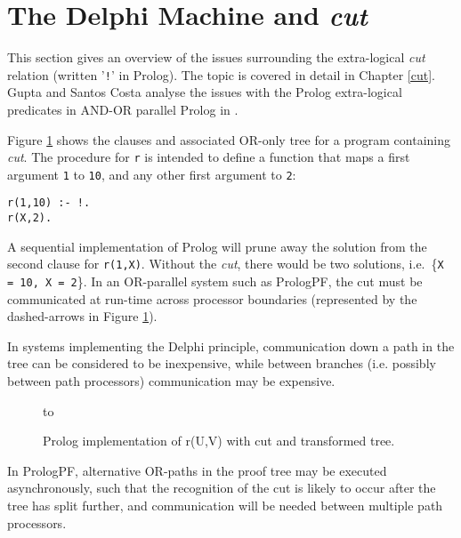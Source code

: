 \section{The Delphi Machine and \textit{cut}} %

This section gives an overview of the issues surrounding the extra-logical \textit{cut}
relation (written '\texttt{!}' in Prolog).  The topic is covered in detail in
Chapter \ref{cut}.  Gupta and Santos Costa analyse the issues with the Prolog extra-logical
predicates in AND-OR parallel Prolog in \cite{GSC92}.

Figure \ref{cut_tree} shows the clauses and associated OR-only tree for a 
program containing \textit{cut}.  The procedure for \texttt{r} is intended to
define a function that maps a first argument
 \texttt{1} to \texttt{10}, and any other first argument
to \texttt{2}:
\begin{verbatim}
r(1,10) :- !.
r(X,2).
\end{verbatim}

A sequential implementation of Prolog will prune away
the solution from the second clause
for \texttt{r(1,X)}.  Without the \textit{cut}, there
would be two solutions, i.e.\ \{\texttt{X = 10, X = 2}\}.
In an OR-parallel system such as PrologPF, the cut must be
communicated at run-time
across processor boundaries (represented by the dashed-arrows in
Figure \ref{cut_tree}).

In systems implementing the Delphi principle, communication down
a path in the tree can be considered to be inexpensive, while between branches
(i.e. possibly between path processors) communication may be expensive.

\begin{figure}[h]
\vspace{5mm} \hbox to 
\caption{Prolog implementation of r(U,V) with cut and transformed tree.}
\vspace{5mm}
\label{cut_tree}
\end{figure}

In PrologPF, alternative OR-paths in the proof tree may be executed asynchronously, such
that the recognition of the cut is likely to occur after the tree has split further, and
communication will be needed between multiple path processors.

